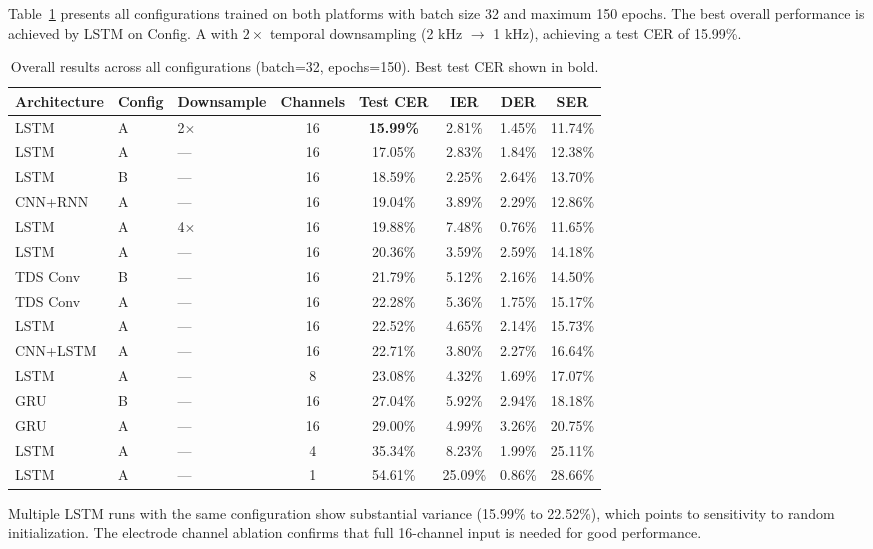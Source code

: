 \documentclass{article}
\begin{document}
Table~\ref{tab:main_results} presents all configurations trained on both platforms with batch size 32 and maximum 150 epochs. The best overall performance is achieved by LSTM on Config. A with $2\times$ temporal downsampling (2 kHz $\to$ 1 kHz), achieving a test CER of 15.99\%.

\begin{table}[h]
\centering
\caption{Overall results across all configurations (batch=32, epochs=150). Best test CER shown in bold.}
\label{tab:main_results}
\begin{tabular}{lllccccc}
\toprule
\textbf{Architecture} & \textbf{Config} & \textbf{Downsample} & \textbf{Channels} & \textbf{Test CER} & \textbf{IER} & \textbf{DER} & \textbf{SER} \\
\midrule
LSTM & A & 2$\times$ & 16 & \textbf{15.99\%} & 2.81\% & 1.45\% & 11.74\% \\
LSTM & A & --- & 16 & 17.05\% & 2.83\% & 1.84\% & 12.38\% \\
LSTM & B & --- & 16 & 18.59\% & 2.25\% & 2.64\% & 13.70\% \\
CNN+RNN & A & --- & 16 & 19.04\% & 3.89\% & 2.29\% & 12.86\% \\
LSTM & A & 4$\times$ & 16 & 19.88\% & 7.48\% & 0.76\% & 11.65\% \\
LSTM & A & --- & 16 & 20.36\% & 3.59\% & 2.59\% & 14.18\% \\
TDS Conv & B & --- & 16 & 21.79\% & 5.12\% & 2.16\% & 14.50\% \\
TDS Conv & A & --- & 16 & 22.28\% & 5.36\% & 1.75\% & 15.17\% \\
LSTM & A & --- & 16 & 22.52\% & 4.65\% & 2.14\% & 15.73\% \\
CNN+LSTM & A & --- & 16 & 22.71\% & 3.80\% & 2.27\% & 16.64\% \\
LSTM & A & --- & 8 & 23.08\% & 4.32\% & 1.69\% & 17.07\% \\
GRU & B & --- & 16 & 27.04\% & 5.92\% & 2.94\% & 18.18\% \\
GRU & A & --- & 16 & 29.00\% & 4.99\% & 3.26\% & 20.75\% \\
LSTM & A & --- & 4 & 35.34\% & 8.23\% & 1.99\% & 25.11\% \\
LSTM & A & --- & 1 & 54.61\% & 25.09\% & 0.86\% & 28.66\% \\
\bottomrule
\end{tabular}
\end{table}

Multiple LSTM runs with the same configuration show substantial variance (15.99\% to 22.52\%), which points to sensitivity to random initialization. The electrode channel ablation confirms that full 16-channel input is needed for good performance.
\end{document}
